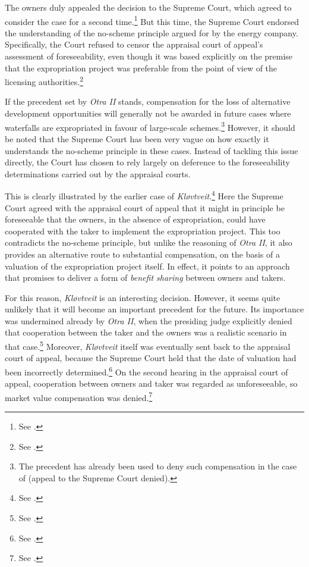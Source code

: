 The owners duly appealed the decision to the Supreme Court, which agreed to consider the case for a second time.\footnote{See \cite{otra13}.} But this time, the Supreme Court endorsed the understanding of the no-scheme principle argued for by the energy company. Specifically, the Court refused to censor the appraisal court of appeal's assessment of foreseeability, even though it was based explicitly on the premise that the expropriation project was preferable from the point of view of the licensing authorities.\footnote{See \cite[53-54]{otra13}.}

If the precedent set by {\it Otra II} stands, compensation for the loss of alternative development opportunities will generally not be awarded in future cases where waterfalls are expropriated in favour of large-scale schemes.\footnote{The precedent has already been used to deny such compensation in the case of \cite{smibelg15} (appeal to the Supreme Court denied).} However, it should be noted that the Supreme Court has been very vague on how exactly it understands the no-scheme principle in these cases. Instead of tackling this issue directly, the Court has chosen to rely largely on deference to the foreseeability determinations carried out by the appraisal courts.

This is clearly illustrated by the earlier case of {\it Kløvtveit}.\footnote{See \cite{klovtveit11}.} Here the Supreme Court agreed with the appraisal court of appeal that it might in principle be foreseeable that the owners, in the absence of expropriation, could have cooperated with the taker to implement the expropriation project. This too contradicts the no-scheme principle, but unlike the reasoning of {\it Otra II}, it also provides an alternative route to substantial compensation, on the basis of a valuation of the expropriation project itself. In effect, it points to an approach that promises to deliver a form of {\it benefit sharing} between owners and takers. 

For this reason, {\it Kløvtveit} is an interesting decision. However, it seems quite unlikely that it will become an important precedent for the future. Its importance was undermined already by {\it Otra II}, when the presiding judge explicitly denied that cooperation between the taker and the owners was a realistic scenario in that case.\footnote{See \cite[69-71]{otra13}.} Moreover, {\it Kløvtveit} itself was eventually sent back to the appraisal court of appeal, because the Supreme Court held that the date of valuation had been incorrectly determined.\footnote{See \cite[35-39]{klovtveit11}.} On the second hearing in the appraisal court of appeal, cooperation between owners and taker was regarded as unforeseeable, so market value compensation was denied.\footnote{See \cite{klovtveit13}.}

